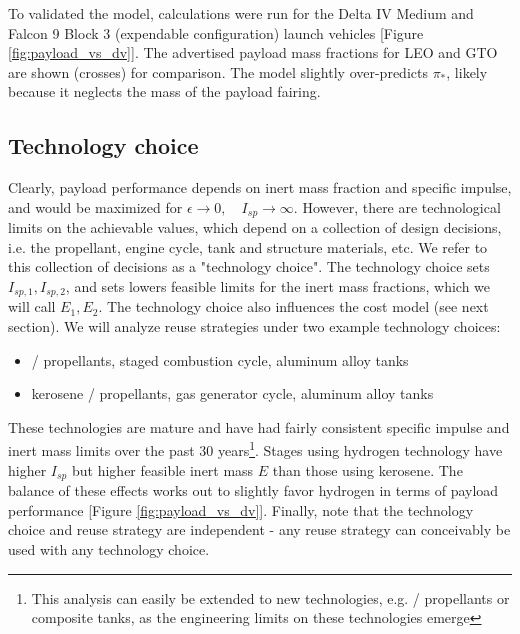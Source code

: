 \documentclass[conf]{new-aiaa}
\begin{document}
\begin{multicols}{2}
To validated the model, calculations were run for the Delta IV Medium and Falcon 9 Block 3 (expendable configuration) launch vehicles [Figure \ref{fig:payload_vs_dv}]. The advertised payload mass fractions for LEO and GTO are shown (crosses) for comparison. The model slightly over-predicts $\pi_*$, likely because it neglects the mass of the payload fairing.

\subsection{Technology choice}
Clearly, payload performance depends on inert mass fraction and specific impulse, and would be maximized for $\epsilon \rightarrow 0, \quad I_{sp} \rightarrow \infty$. However, there are technological limits on the achievable values, which depend on a collection of design decisions, i.e. the propellant, engine cycle, tank and structure materials, etc. We refer to this collection of decisions as a "technology choice". The technology choice sets $I_{sp, 1}, I_{sp, 2}$, and sets lowers feasible limits for the inert mass fractions, which we will call $E_1, E_2$. The technology choice also influences the cost model (see next section). We will analyze reuse strategies under two example technology choices:

\begin{itemize}
    \item {} /  propellants, staged combustion cycle, aluminum alloy tanks
    \item kerosene /  propellants, gas generator cycle, aluminum alloy tanks
\end{itemize}

These technologies are mature and have had fairly consistent specific impulse and inert mass limits over the past 30 years\footnote{This analysis can easily be extended to new technologies, e.g.  /  propellants or composite tanks, as the engineering limits on these technologies emerge}. Stages using hydrogen technology have higher $I_{sp}$ but higher feasible inert mass $E$ than those using kerosene. The balance of these effects works out to slightly favor hydrogen in terms of payload performance [Figure \ref{fig:payload_vs_dv}]. Finally, note that the technology choice and reuse strategy are independent - any reuse strategy can conceivably be used with any technology choice.


\end{multicols}
\end{document}
